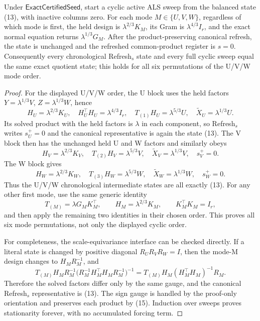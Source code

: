 \begin{proposition}\label{prop:step-013-cyclic-fixed}
Under \(\mathsf{ExactCertifiedSeed}\), start a
cyclic active ALS sweep from the balanced state (13), with inactive columns
zero. For each mode \(M\in\{U,V,W\}\), regardless of which mode is first,
the held design is \(\lambda^{2/3}K_M\), its Gram is
\(\lambda^{4/3}I_r\), and the exact normal equation returns
\(\lambda^{1/3}G_M\). After the product-preserving canonical refresh, the
state is unchanged and the refreshed common-product register is \(s=0\).
Consequently every chronological Refresh$_s$ state and every full cyclic
sweep equal the same exact quotient state; this holds for all six
permutations of the U/V/W mode order.

\begin{proof}
For the displayed U/V/W order, the U block uses
the held factors \(Y=\lambda^{1/3}V\), \(Z=\lambda^{1/3}W\), hence
\[
H_U=\lambda^{2/3}K_U,\quad H_U^\top H_U=\lambda^{4/3}I_r,\quad
T_{(1)}H_U=\lambda^{5/3}U,\quad
\widetilde X_U=\lambda^{1/3}U.
\tag{16}
\]
Its solved product with the held factors is \(\lambda\) in each component,
so Refresh$_s$ writes \(s_U^+=0\) and the canonical representative is again
the state (13). The V block then has the unchanged held U and W factors and
similarly obeys
\[
H_V=\lambda^{2/3}K_V,\quad
T_{(2)}H_V=\lambda^{5/3}V,\quad
\widetilde X_V=\lambda^{1/3}V,\quad s_V^+=0.
\tag{17}
\]
The W block gives
\[
H_W=\lambda^{2/3}K_W,\quad
T_{(3)}H_W=\lambda^{5/3}W,\quad
\widetilde X_W=\lambda^{1/3}W,\quad s_W^+=0.
\tag{18}
\]
Thus the U/V/W chronological intermediate states are all exactly (13).
For any other first mode, use the same generic identity
\[
T_{(M)}=\lambda G_MK_M^\top,\qquad
H_M=\lambda^{2/3}K_M,\qquad K_M^\top K_M=I_r,
\tag{19}
\]
and then apply the remaining two identities in their chosen order. This
proves all six mode permutations, not only the displayed cyclic order.

For completeness, the scale-equivariance interface can be checked
directly. If a literal state is changed by positive diagonal
\(R_UR_VR_W=I\), then the mode-M design changes to \(H_MR_M^{-1}\), and
\[
T_{(M)}H_MR_M^{-1}
\big(R_M^{-1}H_M^\top H_MR_M^{-1}\big)^{-1}
=T_{(M)}H_M(H_M^\top H_M)^{-1}R_M.
\tag{20}
\]
Therefore the solved factors differ only by the same gauge, and the
canonical Refresh$_s$ representative is (13). The sign gauge is handled by
the proof-only orientation and preserves each product by (15). Induction
over sweeps proves stationarity forever, with no accumulated forcing term.



\end{proof}
\end{proposition}
